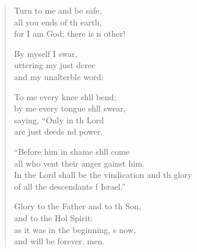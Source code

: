 \begin{verse}
\begin{patverse}
Turn to me and be safe,\Flex\\
all you ends of th earth,\Med\\
for I am God; there is n other!

By myself I swar,\Flex\\
uttering my just dcree\Med\\
and my unalterble word:

To me every knee shll bend;\Med\\
by me every tongue shll swear,\\
saying, “Only in th Lord\Med\\
are just deeds nd power.

“Before him in shame shll come\Med\\
all who vent their anger gainst him.\\
In the Lord shall be the vindication and th glory\Med\\
of all the descendants f Israel.”

Glory to the Father and to th Son,\Med\\
and to the Hol Spirit:\\
as it was in the beginning, \pointup{\i}s now,\Med\\
and will be forever. men.
  \end{patverse}
\end{verse}
